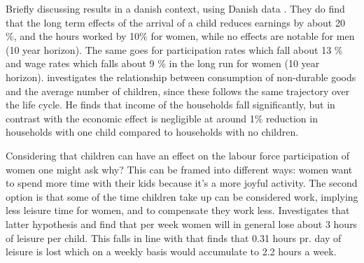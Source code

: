 Briefly discussing results in a danish context, using Danish data \textcite{kleven_children_2019}. They do find that the long term effects of the arrival of a child reduces earnings by about 20 \%, and the hours worked by 10\% for women, while no effects are notable for men (10 year horizon). The same goes for participation rates which fall about 13 \% and wage rates which falls about 9 \% in the long run for women (10 year horizon). \textcite{jorgensen_life-cycle_2017} investigates the relationship between consumption of non-durable goods and the average number of children, since these follows the same trajectory over the life cycle. He finds that income of the households fall significantly, but in contrast with \textcite{kleven_children_2019} the economic effect is negligible at around 1\% reduction in households with one child compared to households with no children. 

Considering that children can have an effect on the labour force participation of women one might ask why? This can be framed into different ways: women want to spend more time with their kids because it's a more joyful activity. The second option is that some of the time children take up can be considered work, implying less leisure time for women, and to compensate they work less. \textcite{firestone_estimation_1988} Investigates that latter hypothesis and find that per week women will in general lose about 3 hours of leisure per child. This falls in line with \textcite{thrane_men_2000} that finds that 0.31 hours pr. day of leisure is lost which on a weekly basis would accumulate to 2.2 hours a week.